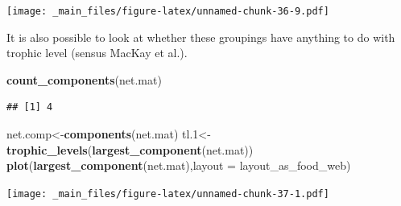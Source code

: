 \documentclass[
]{book}
\newenvironment{Shaded}{\begin{snugshade}}{\end{snugshade}}
\newcommand{\AttributeTok}[1]{\textcolor[rgb]{0.13,0.29,0.53}{#1}}
\newcommand{\DecValTok}[1]{\textcolor[rgb]{0.00,0.00,0.81}{#1}}
\newcommand{\FloatTok}[1]{\textcolor[rgb]{0.00,0.00,0.81}{#1}}
\newcommand{\FunctionTok}[1]{\textcolor[rgb]{0.13,0.29,0.53}{\textbf{#1}}}
\newcommand{\NormalTok}[1]{#1}
\newcommand{\OtherTok}[1]{\textcolor[rgb]{0.56,0.35,0.01}{#1}}
\newcommand{\SpecialCharTok}[1]{\textcolor[rgb]{0.81,0.36,0.00}{\textbf{#1}}}
\newcommand{\StringTok}[1]{\textcolor[rgb]{0.31,0.60,0.02}{#1}}
\theoremstyle{definition}
\theoremstyle{definition}
\theoremstyle{definition}
\theoremstyle{definition}
\theoremstyle{remark}
\begin{document}
\begin{Shaded}
\end{Shaded}

\texttt{[image: \_main\_files/figure-latex/unnamed-chunk-36-9.pdf]}

It is also possible to look at whether these groupings have anything to do with trophic level (sensus MacKay et al.).

\begin{Shaded}
\begin{Highlighting}[]
\FunctionTok{count\_components}\NormalTok{(net.mat)}
\end{Highlighting}
\end{Shaded}

\begin{verbatim}
## [1] 4
\end{verbatim}

\begin{Shaded}
\begin{Highlighting}[]
\NormalTok{net.comp}\OtherTok{\textless{}{-}}\FunctionTok{components}\NormalTok{(net.mat)}
\NormalTok{tl}\FloatTok{.1}\OtherTok{\textless{}{-}}\FunctionTok{trophic\_levels}\NormalTok{(}\FunctionTok{largest\_component}\NormalTok{(net.mat))}
\FunctionTok{plot}\NormalTok{(}\FunctionTok{largest\_component}\NormalTok{(net.mat),}\AttributeTok{layout =}\NormalTok{ layout\_as\_food\_web)}
\end{Highlighting}
\end{Shaded}

\texttt{[image: \_main\_files/figure-latex/unnamed-chunk-37-1.pdf]}

\begin{Shaded}
\end{Shaded}
\end{document}
